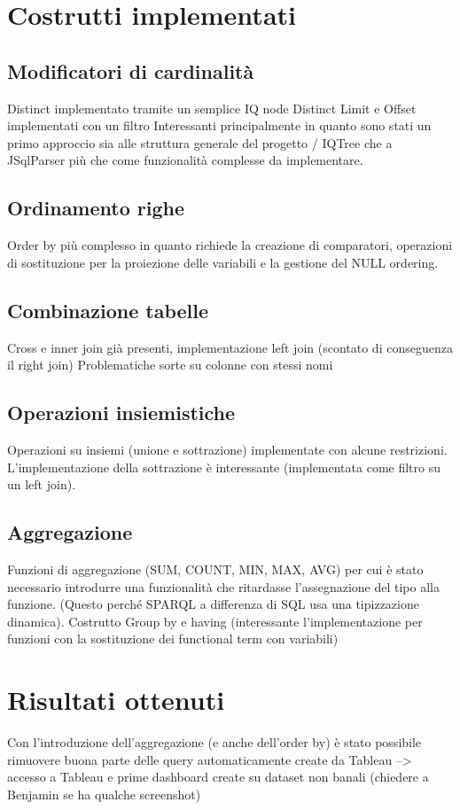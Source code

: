 \section{Costrutti implementati}
\label{sec:implementation}

\subsection{Modificatori di cardinalità}


Distinct implementato tramite un semplice IQ node Distinct
Limit e Offset implementati con un filtro
Interessanti principalmente in quanto sono stati un primo approccio sia alle struttura generale del progetto / IQTree che a JSqlParser più che come funzionalità complesse da implementare.

\subsection{Ordinamento righe}
Order by più complesso in quanto richiede la creazione di comparatori, operazioni di sostituzione per la proiezione delle variabili 
e la gestione del NULL ordering.

\subsection{Combinazione tabelle}
Cross e inner join già presenti, implementazione left join (scontato di conseguenza il right join) 
Problematiche sorte su colonne con stessi nomi

\subsection{Operazioni insiemistiche}
Operazioni su insiemi (unione e sottrazione) implementate con alcune restrizioni.
L'implementazione della sottrazione è interessante (implementata come filtro su un left join).

\subsection{Aggregazione}
Funzioni di aggregazione (SUM, COUNT, MIN, MAX, AVG) per cui è stato necessario introdurre una funzionalità che ritardasse l'assegnazione del 
tipo alla funzione. (Questo perché SPARQL a differenza di SQL usa una tipizzazione dinamica).
Costrutto Group by e having (interessante l'implementazione per funzioni con la sostituzione dei functional term con variabili)

\section{Risultati ottenuti}
Con l'introduzione dell'aggregazione (e anche dell'order by) è stato possibile rimuovere buona parte delle query automaticamente create da Tableau --> accesso a Tableau 
e prime dashboard create su dataset non banali (chiedere a Benjamin se ha qualche screenshot)
